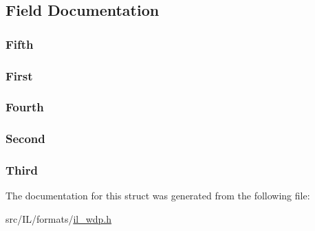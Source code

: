 \subsection{Field Documentation}
\hypertarget{struct_w_d_p_g_u_i_d_af5a34e251fc670ba653e8df9b0b62583}{
\subsubsection[{Fifth}]{ Fifth}}\label{struct_w_d_p_g_u_i_d_af5a34e251fc670ba653e8df9b0b62583}
\hypertarget{struct_w_d_p_g_u_i_d_abaf6ad56108ad00e5270bca08b905d7f}{
\subsubsection[{First}]{ First}}\label{struct_w_d_p_g_u_i_d_abaf6ad56108ad00e5270bca08b905d7f}
\hypertarget{struct_w_d_p_g_u_i_d_a51cc81b0d4570c61909ecf61a9c3fbf2}{
\subsubsection[{Fourth}]{ Fourth}}\label{struct_w_d_p_g_u_i_d_a51cc81b0d4570c61909ecf61a9c3fbf2}
\hypertarget{struct_w_d_p_g_u_i_d_a57dd70b59f7720c5ff7f8a9d36621cd3}{
\subsubsection[{Second}]{ Second}}\label{struct_w_d_p_g_u_i_d_a57dd70b59f7720c5ff7f8a9d36621cd3}
\hypertarget{struct_w_d_p_g_u_i_d_a58c69b1ba24198c7f0ce762b31736d8d}{
\subsubsection[{Third}]{ Third}}\label{struct_w_d_p_g_u_i_d_a58c69b1ba24198c7f0ce762b31736d8d}


The documentation for this struct was generated from the following file\-:\begin{DoxyCompactItemize}
\item 
src/\-I\-L/formats/\hyperlink{il__wdp_8h}{il\-\_\-wdp.\-h}\end{DoxyCompactItemize}
